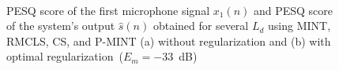\documentclass[10pt]{IEEEtran}
\begin{document}
\begin{figure}[t]
\centering
\hbox{
}
\caption{PESQ score of the first microphone signal $x_1(n)$ and PESQ score of the system's output $\hat{s}(n)$ obtained for several $L_d$ using MINT, RMCLS, CS, and P-MINT (a) without regularization and (b) with optimal regularization~($E_m = -33$~dB)}
\end{figure}
\end{document}
